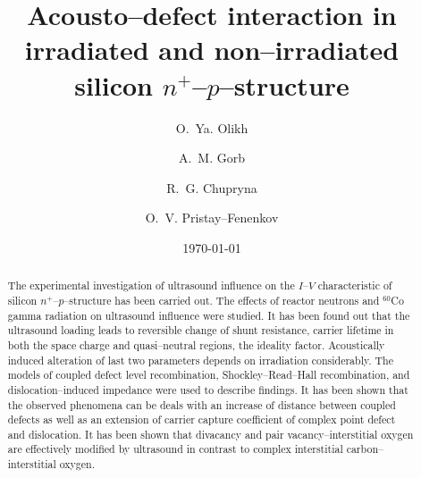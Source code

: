 \documentclass[aip,jap, amsmath,amssymb,reprint]{revtex4-1}
\begin{document}

\title{Acousto--defect interaction in irradiated and non--irradiated silicon $n^+$--$p$--structure}
\author{O.~Ya. Olikh}


\author{A.~M. Gorb}


\author{R.~G. Chupryna}

\author{O.~V. Pristay--Fenenkov}%





\date{\today}

\begin{abstract}
The experimental investigation of ultrasound influence on the $I$--$V$ characteristic of silicon $n^+$--$p$--structure has been carried out.
The effects of reactor neutrons and $^{60}$Co gamma radiation on ultrasound influence were studied. 
It has been found out that the ultrasound loading leads to reversible change of shunt resistance, carrier lifetime in both the space charge and quasi--neutral regions, the ideality factor.
Acoustically induced alteration of last two parameters depends on irradiation considerably.
The models of coupled defect level recombination, Shockley--Read--Hall recombination, and dislocation--induced impedance were used to describe findings.
It has been shown that the observed phenomena can be deals with an increase of distance between coupled defects as well as an extension of carrier capture coefficient of complex point defect and dislocation.
It has been shown that divacancy and pair vacancy--interstitial oxygen are effectively modified by ultrasound in contrast to complex interstitial carbon--interstitial oxygen.
\end{abstract}


\maketitle %
\end{document}
